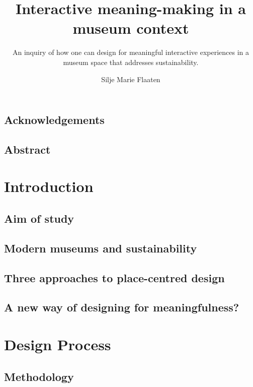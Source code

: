 \documentclass[UKenglish]{ifimaster}
\title{Interactive meaning-making in a museum context}
\subtitle{An inquiry of how one can design for meaningful interactive experiences in a museum space that addresses sustainability.}
\author{Silje Marie Flaaten}
\begin{document}
\duoforside[dept={Department of Informatics}, program={Informatics: design, use, interaction},long]
\frontmatter{}

\chapter*{Acknowledgements}


\chapter*{Abstract}


\tableofcontents{}
\listoffigures{}
\listoftables{}

\mainmatter{}

\part{Introduction}

\chapter{ Aim of study}


\chapter{ Modern museums and sustainability}


\chapter{ Three approaches to place-centred design}


\chapter{ A new way of designing for meaningfulness?}



\part{Design Process}

\chapter{ Methodology}

\end{document}

